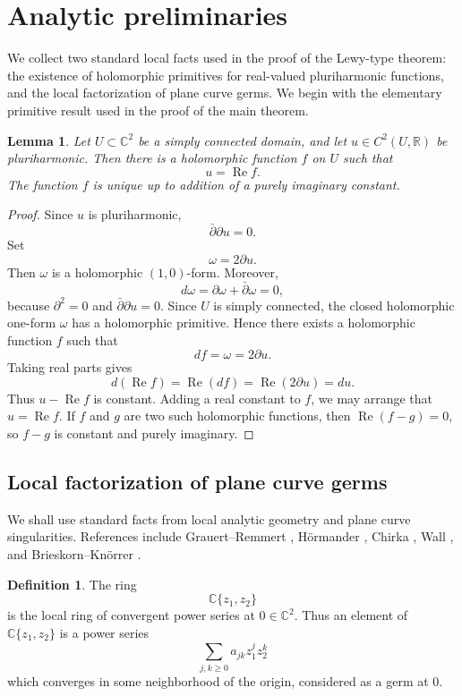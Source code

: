 \documentclass[11pt]{amsart}
\newtheorem{lemma}[theorem]{Lemma}
\theoremstyle{definition}
\newtheorem{definition}[theorem]{Definition}
\theoremstyle{remark}
\newcommand{\C}{\mathbb C}
\newcommand{\R}{\mathbb R}
\newcommand{\re}{\operatorname{Re}}
\begin{document}
\section{Analytic preliminaries}

We collect two standard local facts used in the proof of the Lewy-type
theorem: the existence of holomorphic primitives for real-valued
pluriharmonic functions, and the local factorization of plane curve germs.
We begin with the elementary primitive result used in the proof of the main
theorem.

\begin{lemma}\label{lem:primitive}
Let $U\subset\C^2$ be a simply connected domain, and let
$u\in C^2(U,\R)$ be pluriharmonic. Then there is a holomorphic function
$f$ on $U$ such that
\[
        u=\re f.
\]
The function $f$ is unique up to addition of a purely imaginary
constant.
\end{lemma}

\begin{proof}
Since $u$ is pluriharmonic,
\[
        \bar\partial\partial u=0.
\]
Set
\[
        \omega=2\partial u.
\]
Then $\omega$ is a holomorphic $(1,0)$-form. Moreover,
\[
        d\omega=\partial\omega+\bar\partial\omega=0,
\]
because $\partial^2=0$ and $\bar\partial\partial u=0$. Since $U$ is
simply connected, the closed holomorphic one-form $\omega$ has a
holomorphic primitive. Hence there exists a holomorphic function $f$
such that
\[
        df=\omega=2\partial u.
\]
Taking real parts gives
\[
        d(\re f)=\re(df)=\re(2\partial u)=du.
\]
Thus $u-\re f$ is constant. Adding a real constant to $f$, we may
arrange that $u=\re f$. If $f$ and $g$ are two such holomorphic
functions, then $\re(f-g)=0$, so $f-g$ is constant and purely imaginary.
\end{proof}

\subsection{Local factorization of plane curve germs}

We shall use standard facts from local analytic geometry and plane curve
singularities. References include Grauert--Remmert
\cite[Ch.~2]{GrauertRemmert1984}, H\"ormander \cite[Ch.~VI]{Hormander1990},
Chirka \cite{Chirka1989}, Wall \cite[Ch.~2]{Wall2004}, and
Brieskorn--Kn\"orrer \cite[Ch.~8]{BrieskornKnorrer1986}.

\begin{definition}\label{def:convergent-power-series}
The ring
\[
        \C\{z_1,z_2\}
\]
is the local ring of convergent power series at $0\in\C^2$. Thus an
element of $\C\{z_1,z_2\}$ is a power series
\[
        \sum_{j,k\ge0} a_{jk}z_1^jz_2^k
\]
which converges in some neighborhood of the origin, considered as a germ
at $0$.
\end{definition}
\end{document}
